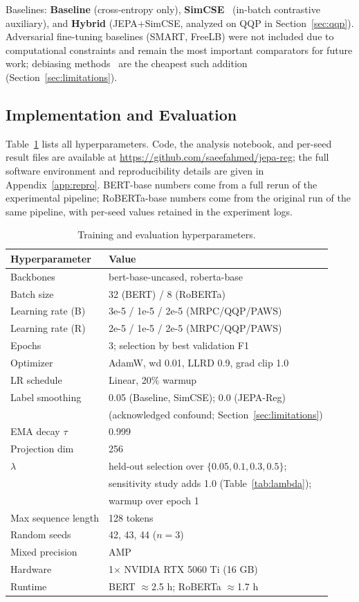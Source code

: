 \documentclass[sigconf]{acmart}
\begin{document}
Baselines: \textbf{Baseline} (cross-entropy only), \textbf{SimCSE}~\cite{gao2021simcse} (in-batch contrastive auxiliary), and \textbf{Hybrid} (JEPA+SimCSE, analyzed on QQP in Section~\ref{sec:qqp}). Adversarial fine-tuning baselines (SMART, FreeLB) were not included due to computational constraints and remain the most important comparators for future work; debiasing methods~\cite{clark2019dont,utama2020towards} are the cheapest such addition (Section~\ref{sec:limitations}).

\subsection{Implementation and Evaluation}
\label{sec:implementation}
Table~\ref{tab:hyper} lists all hyperparameters. Code, the analysis notebook, and per-seed result files are available at \url{https://github.com/saeefahmed/jepa-reg}; the full software environment and reproducibility details are given in Appendix~\ref{app:repro}. BERT-base numbers come from a full rerun of the experimental pipeline; RoBERTa-base numbers come from the original run of the same pipeline, with per-seed values retained in the experiment logs.

\begin{table}[!htbp]
\caption{Training and evaluation hyperparameters.}
\label{tab:hyper}
\begin{tabular}{ll}
\toprule
Hyperparameter & Value \\
\midrule
Backbones & bert-base-uncased, roberta-base \\
Batch size & 32 (BERT) / 8 (RoBERTa) \\
Learning rate (B) & 3e-5 / 1e-5 / 2e-5 (MRPC/QQP/PAWS) \\
Learning rate (R) & 2e-5 / 1e-5 / 2e-5 (MRPC/QQP/PAWS) \\
Epochs & 3; selection by best validation F1 \\
Optimizer & AdamW, wd 0.01, LLRD 0.9, grad clip 1.0 \\
LR schedule & Linear, 20\% warmup \\
Label smoothing & 0.05 (Baseline, SimCSE); 0.0 (JEPA-Reg) \\
 & \quad (acknowledged confound; Section~\ref{sec:limitations}) \\
EMA decay $\tau$ & 0.999 \\
Projection dim & 256 \\
$\lambda$ & held-out selection over $\{0.05, 0.1, 0.3, 0.5\}$; \\
 & \quad sensitivity study adds 1.0 (Table~\ref{tab:lambda}); \\
 & \quad warmup over epoch 1 \\
Max sequence length & 128 tokens \\
Random seeds & 42, 43, 44 ($n=3$) \\
Mixed precision & AMP \\
Hardware & 1$\times$ NVIDIA RTX 5060 Ti (16 GB) \\
Runtime & BERT $\approx$2.5 h; RoBERTa $\approx$1.7 h \\
\bottomrule
\end{tabular}
\end{table}
\end{document}
